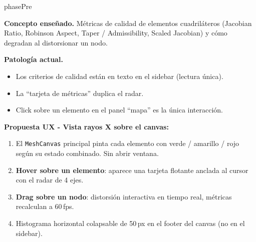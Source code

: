 \documentclass[11pt,a4paper]{article}
\begin{document}
\begin{moduleBox}{phasePre}

\textbf{Concepto enseñado.} Métricas de calidad de elementos cuadriláteros
(Jacobian Ratio, Robinson Aspect, Taper / Admissibility, Scaled Jacobian)
y cómo degradan al distorsionar un nodo.

\textbf{Patología actual.}
\begin{itemize}[leftmargin=1em]
  \item Los criterios de calidad están en texto en el sidebar (lectura única).
  \item La ``tarjeta de métricas'' duplica el radar.
  \item Click sobre un elemento en el panel ``mapa'' es la única interacción.
\end{itemize}

\textbf{Propuesta UX - Vista rayos X sobre el canvas:}
\begin{enumerate}[leftmargin=1.2em, itemsep=2pt]
  \item El \texttt{MeshCanvas} principal pinta cada elemento con verde /
        amarillo / rojo según su estado combinado. Sin abrir ventana.
  \item \textbf{Hover sobre un elemento}: aparece una tarjeta flotante
        anclada al cursor con el radar de 4 ejes.
  \item \textbf{Drag sobre un nodo}: distorsión interactiva en tiempo real,
        métricas recalculan a 60\,fps.
  \item Histograma horizontal colapsable de 50\,px en el footer del canvas
        (no en el sidebar).
\end{enumerate}

\begin{center}
\end{center}
\end{moduleBox}
\end{document}

